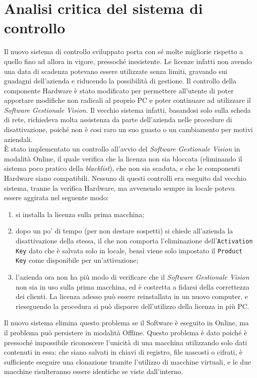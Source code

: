 \section{Analisi critica del sistema di controllo}

Il nuovo sistema di controllo sviluppato porta con sé molte migliorie rispetto a quello fino ad allora in vigore, pressoché inesistente. Le licenze infatti non avendo una data di scadenza potevano essere utilizzate senza limiti, gravando sui guadagni dell'azienda e riducendo la possibilità di gestione. Il controllo della componente Hardware è stato modificato per permettere all'utente di poter apportare modifiche non radicali al proprio PC e poter continuare ad utilizzare il \textit{Software Gestionale Vision}. Il vecchio sistema infatti, basandosi solo sulla scheda di rete, richiedeva molta assistenza da parte dell'azienda nelle procedure di disattivazione, poiché non è cosi raro un suo guasto o un cambiamento per motivi aziendali.
\\È stato implementato un controllo all'avvio del \textit{Software Gestionale Vision} in modalità Online, il quale verifica che la licenza non sia bloccata (eliminando il sistema poco pratico della \textit{blacklist}), che non sia scaduta, e che le componenti Hardware siano compatibili. Nessuno di questi controlli era eseguito dal vecchio sistema, tranne la verifica Hardware, ma avvenendo sempre in locale poteva essere aggirata nel seguente modo:
\begin{enumerate}
\item si installa la licenza sulla prima macchina;
\item dopo un po' di tempo (per non destare sospetti) si chiede all'azienda la disattivazione della stessa, il che non comporta l'eliminazione dell'\texttt{Activation Key} dato che è salvata solo in locale, bensì viene solo impostato il \texttt{Product Key} come disponibile per un'attivazione;
\item l'azienda ora non ha più modo di verificare che il \textit{Software Gestionale Vision} non sia in uso sulla prima macchina, ed è costretta a fidarsi della correttezza dei clienti. La licenza adesso può essere reinstallata in un nuovo computer, e rieseguendo la procedura si può disporre dell'utilizzo della licenza in più PC.
\end{enumerate}
Il nuovo sistema elimina questo problema se il Software è eseguito in Online, ma il problema può persistere in modalità Offline. Questo problema è dato poiché è pressoché impossibile riconoscere l'unicità di una macchina utilizzando solo dati contenuti in essa: che siano salvati in chiavi di registro, file nascosti o cifrati, è sufficiente eseguire una clonazione tramite l'utilizzo di macchine virtuali, e le due macchine risulteranno essere identiche se viste dall'interno.
